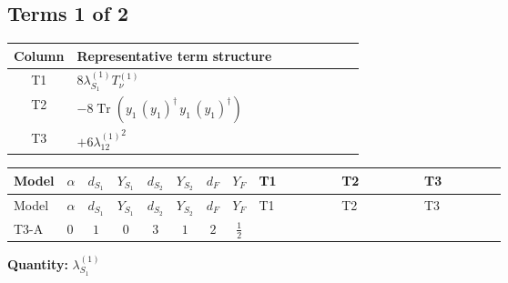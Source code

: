 \documentclass[8pt]{article}
\begin{document}
\begin{landscape}
\subsection*{Terms 1 of 2}
\begin{center}
\begin{tabular}{@{}c >{\raggedright\arraybackslash}p{0.82\linewidth}@{}}
\toprule
Column & Representative term structure \\
\midrule
T1 & \(\displaystyle 8 {\lambda_{S_1}^{(1)}} T_{\nu}^{(1)}\) \\
\midrule
T2 & \(\displaystyle -8 \operatorname{Tr}\!\left({y_1}\,\left({y_1}\right)^{\dagger}\,{y_1}\,\left({y_1}\right)^{\dagger}\right)\) \\
\midrule
T3 & \(\displaystyle +6 {\lambda_{12}^{(1)}}^2\) \\
\midrule
\bottomrule
\end{tabular}
\end{center}
\smallskip
\tiny
\begin{longtable}{@{}llcccccc >{\raggedright\arraybackslash}p{0.21\linewidth} >{\raggedright\arraybackslash}p{0.21\linewidth} >{\raggedright\arraybackslash}p{0.21\linewidth}@{}}
\toprule
Model & $\alpha$ & $d_{S_1}$ & $Y_{S_1}$ & $d_{S_2}$ & $Y_{S_2}$ & $d_F$ & $Y_F$ & T1 & T2 & T3 \\
\midrule
\endfirsthead
\toprule
Model & $\alpha$ & $d_{S_1}$ & $Y_{S_1}$ & $d_{S_2}$ & $Y_{S_2}$ & $d_F$ & $Y_F$ & T1 & T2 & T3 \\
\midrule
\endhead
T3-A & $0$ & $1$ & $0$ & $3$ & $1$ & $2$ & $\frac{1}{2}$ & \scriptsize\adjustbox{max width=\linewidth}{$\begin{gathered} 8 {\lambda_{S_1}^{(1)}} T_{\nu}^{(1)}\end{gathered}$} & \scriptsize\adjustbox{max width=\linewidth}{$\begin{gathered} -8 \operatorname{Tr}\!\left({y_1}\,\left({y_1}\right)^{\dagger}\,{y_1}\,\left({y_1}\right)^{\dagger}\right)\end{gathered}$} & \scriptsize\adjustbox{max width=\linewidth}{$\begin{gathered} +6 {\lambda_{12}^{(1)}}^2\end{gathered}$} \\
\midrule
\bottomrule
\end{longtable}
\clearpage
\noindent\textbf{Quantity: }$\lambda_{S_1}^{(1)}$\par\smallskip

\end{landscape}
\end{document}
